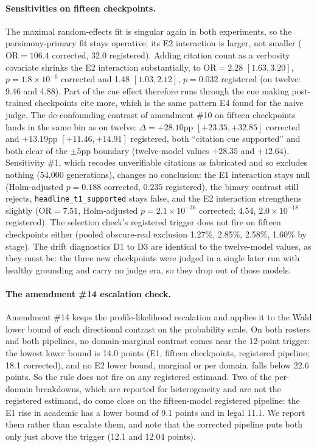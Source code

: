 \paragraph{Sensitivities on fifteen checkpoints.}
The maximal random-effects fit is singular again in both experiments, so the
parsimony-primary fit stays operative; its E2 interaction is larger, not
smaller ($\mathrm{OR} = 106.4$ corrected, 32.0 registered). Adding citation
count as a verbosity covariate shrinks the E2 interaction substantially, to
$\mathrm{OR} = 2.28$ $[1.63, 3.20]$, $p = 1.8 \times 10^{-6}$ corrected and
1.48 $[1.03, 2.12]$, $p = 0.032$ registered (on twelve: 9.46 and 4.88). Part of
the cue effect therefore runs through the cue making post-trained checkpoints
cite more, which is the same pattern E4 found for the naive judge. The
de-confounding contrast of amendment \#10 on fifteen checkpoints lands in the
same bin as on twelve: $\Delta = +28.10$pp $[+23.35, +32.85]$ corrected and
$+13.19$pp $[+11.46, +14.91]$ registered, both ``citation cue supported'' and
both clear of the $\pm 5$pp boundary (twelve-model values $+28.35$ and
$+12.64$). Sensitivity \#1, which recodes unverifiable citations as fabricated
and so excludes nothing (54,000 generations), changes no conclusion: the E1
interaction stays null (Holm-adjusted $p = 0.188$ corrected, $0.235$
registered), the binary contrast still rejects, \texttt{headline\_t1\_supported}
stays false, and the E2 interaction strengthens slightly ($\mathrm{OR} = 7.51$,
Holm-adjusted $p = 2.1 \times 10^{-36}$ corrected; 4.54,
$2.0 \times 10^{-18}$ registered). The selection check's registered trigger does not
fire on fifteen checkpoints either (pooled obscure-real exclusion 1.27\%,
2.85\%, 2.58\%, 1.60\% by stage). The drift diagnostics D1 to D3 are identical
to the twelve-model values, as they must be: the three new checkpoints were
judged in a single later run with healthy grounding and carry no judge era, so
they drop out of those models.

\paragraph{The amendment \#14 escalation check.}
Amendment \#14 keeps the profile-likelihood escalation and applies it to the
Wald lower bound of each directional contrast on the probability scale. On both
rosters and both pipelines, no domain-marginal contrast comes near the 12-point
trigger: the lowest lower bound is 14.0 points (E1, fifteen checkpoints,
registered pipeline; 18.1 corrected), and no E2 lower bound, marginal or per
domain, falls below 22.6 points. So the rule does not fire on any registered estimand. Two of the
per-domain breakdowns, which are reported for heterogeneity and are not the
registered estimand, do come close on the fifteen-model registered pipeline:
the E1 rise in academic has a lower bound of 9.1 points and in legal 11.1. We
report them rather than escalate them, and note that the corrected pipeline
puts both only just above the trigger (12.1 and 12.04 points).

